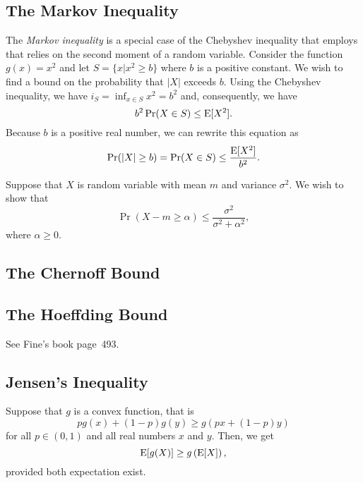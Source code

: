 \subsection{The Markov Inequality}

The \emph{Markov inequality} is a special case of the Chebyshev inequality that employs that relies on the second moment of a random variable. 
Consider the function  $g(x) = x^2$ and let $S = \{ x | x^2 \geq b \}$ where $b$ is a positive constant.
We wish to find a bound on the probability that $|X|$ exceeds $b$.
Using the Chebyshev inequality, we have $i_S = \inf_{x \in S} x^2 = b^2$ and, consequently, we have
\begin{equation*}
b^2 \Pr (X \in S) \leq \mathrm{E} [X^2] .
\end{equation*}
Because $b$ is a positive real number, we can rewrite this equation as
\begin{equation*}
\Pr (|X| \geq b) = \Pr (X \in S) \leq \frac{\mathrm{E} [X^2]}{b^2} .
\end{equation*}


\newpage

\begin{example}
Suppose that $X$ is random variable with mean $m$ and variance $\sigma^2$.
We wish to show that
\begin{equation*}
\Pr ( X - m \geq \alpha ) \leq \frac{\sigma^2}{\sigma^2 + \alpha^2},
\end{equation*}
where $\alpha \geq 0$.
\end{example}


\subsection{The Chernoff Bound}

\subsection{The Hoeffding Bound}

See Fine's book page~493.

\subsection{Jensen's Inequality}

Suppose that $g$ is a convex function, that is
\begin{equation*}
p g(x) + (1-p) g(y) \geq g(px + (1-p)y)
\end{equation*}
for all $p \in (0,1)$ and all real numbers $x$ and $y$.
Then, we get
\begin{equation*}
\mathrm{E} [g(X)] \geq g \left( \mathrm{E} [X] \right) ,
\end{equation*}
provided both expectation exist.


